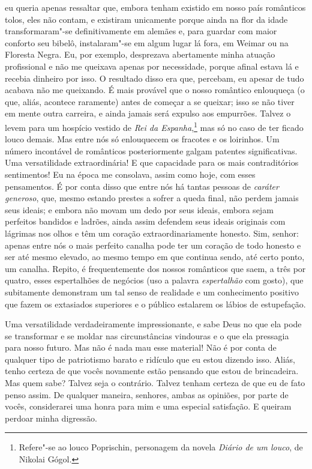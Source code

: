 eu queria apenas ressaltar que, embora tenham existido em nosso país românticos
tolos, eles não contam, e existiram unicamente porque ainda na flor da idade
transformaram"-se definitivamente em alemães e, para guardar com maior conforto
seu bibelô, instalaram"-se em algum lugar lá fora, em Weimar ou na Floresta
Negra. Eu, por exemplo, desprezava abertamente minha atuação profissional e não
me queixava apenas por necessidade, porque afinal estava lá e recebia dinheiro
por isso. O resultado disso era que, percebam, eu apesar de tudo acabava não me
queixando. É mais provável que o nosso romântico enlouqueça (o que, aliás,
acontece raramente) antes de começar a se queixar; isso se não tiver em mente
outra carreira, e ainda jamais será expulso aos empurrões. Talvez o levem para
um hospício vestido de \textit{Rei da Espanha},\footnote{ Refere"-se ao louco
Poprischin, personagem da novela \textit{Diário de um louco}, de Nikolai
Gógol.} mas só no caso de ter ficado louco demais. Mas entre nós só enlouquecem
os fracotes e os loirinhos. Um número incontável de românticos posteriormente
galgam patentes significativas. Uma versatilidade extraordinária! E que
capacidade para os mais contraditórios sentimentos! Eu na época me consolava,
assim como hoje, com esses pensamentos. É por conta disso que entre nós há
tantas pessoas de \textit{caráter generoso}, que, mesmo estando prestes a sofrer a
queda final, não perdem jamais seus ideais; e embora não movam um dedo por seus
ideais, embora sejam perfeitos bandidos e ladrões, ainda assim defendem seus
ideais originais com lágrimas nos olhos e têm um coração extraordinariamente
honesto. Sim, senhor: apenas entre nós o mais perfeito canalha pode ter um
coração de todo honesto e ser até mesmo elevado, ao mesmo tempo em que continua
sendo, até certo ponto, um canalha. Repito, é frequentemente dos nossos
românticos que saem, a três por quatro, esses espertalhões de negócios (uso a
palavra \textit{espertalhão} com gosto), que subitamente demonstram um tal senso de
realidade e um conhecimento positivo que fazem os extasiados superiores e o
público estalarem os lábios de estupefação.

Uma versatilidade verdadeiramente impressionante, e sabe Deus no que ela
pode se transformar e se moldar nas circunstâncias vindouras e o que
ela pressagia para nosso futuro. Mas não é nada mau esse material! Não
é por conta de qualquer tipo de patriotismo barato e ridículo que eu
estou dizendo isso. Aliás, tenho certeza de que vocês novamente estão
pensando que estou de brincadeira. Mas quem sabe? Talvez seja o
contrário. Talvez tenham certeza de que eu de fato penso assim. De
qualquer maneira, senhores, ambas as opiniões, por parte de vocês,
considerarei uma honra para mim e uma especial satisfação. E queiram
perdoar minha digressão.

